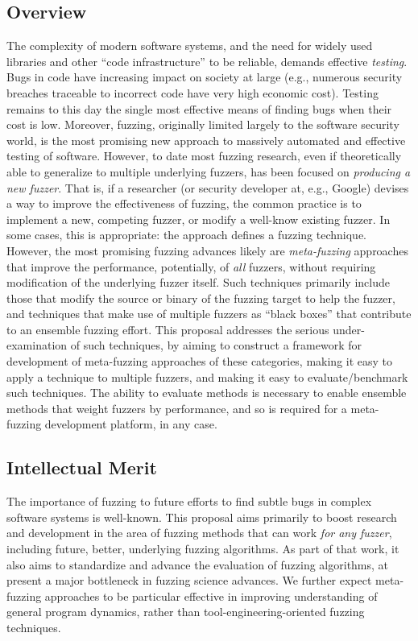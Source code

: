 \centerline{}


\cut{
}

\subsection*{Overview}
\vspace{-2mm}
The complexity of modern software systems, and the need for widely used 
libraries and other ``code infrastructure'' to be reliable, demands effective 
\emph{testing}.  Bugs in code have increasing impact on society at large (e.g., 
numerous security breaches traceable to incorrect code have very high economic 
cost).  Testing remains to this day the single most effective means of finding 
bugs when their cost is low.   Moreover, fuzzing, originally limited largely to 
the software security world, is the most promising new approach to massively 
automated and effective testing of software.   However, to date most fuzzing 
research, even if theoretically able to generalize to multiple underlying 
fuzzers, has been focused on \emph{producing a new fuzzer}.  That is, if a 
researcher (or security developer at, e.g., Google) devises a way to improve 
the effectiveness of fuzzing, the common practice is to implement a new, 
competing fuzzer, or modify a well-know existing fuzzer.  In some cases, this 
is appropriate: the approach defines a fuzzing technique.  However, the most 
promising fuzzing advances likely are \emph{meta-fuzzing} approaches that 
improve the performance, potentially, of \emph{all} fuzzers, without requiring 
modification of the underlying fuzzer itself.  Such techniques primarily 
include those that modify the source or binary of the fuzzing target to help 
the fuzzer, and techniques that make use of multiple fuzzers as ``black boxes'' 
that contribute to an ensemble fuzzing effort.  This proposal addresses the 
serious under-examination of such techniques, by aiming to construct a 
framework for development of meta-fuzzing approaches of these categories, 
making it easy to apply a technique to multiple fuzzers, and making it easy to 
evaluate/benchmark such techniques.  The ability to evaluate methods is 
necessary to enable ensemble methods that weight fuzzers by performance, and so 
is required for a meta-fuzzing development platform, in any case.

\subsection*{Intellectual Merit} 
\vspace{-2mm}
The importance of fuzzing to future efforts to find subtle bugs in complex 
software systems is well-known.  This proposal aims primarily to boost research 
and development in the area of fuzzing methods that can work \emph{for any 
fuzzer}, including future, better, underlying fuzzing algorithms.  As part of 
that work, it also aims to standardize and advance the evaluation of fuzzing 
algorithms, at present a major bottleneck in fuzzing science advances.  We 
further expect meta-fuzzing approaches to be particular effective in improving 
understanding of general program dynamics, rather than 
tool-engineering-oriented fuzzing techniques.
